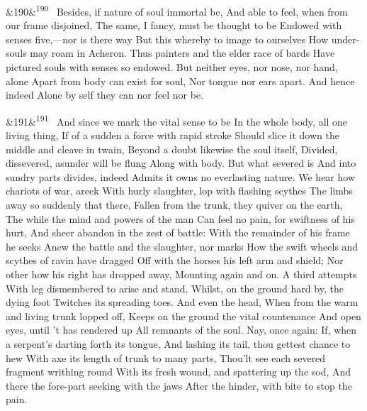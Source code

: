 \documentclass[12pt]{article}
\newcommand{\para}[1][]{\par\noindent\ifx&#1&\else\textsuperscript{\footnotesize #1}~\fi}
\begin{document}
\para[190] Besides, if nature of soul immortal be, And able to feel, when from our frame disjoined, The same, I fancy, must be thought to be Endowed with senses five,---nor is there way But this whereby to image to ourselves How under-souls may roam in Acheron. Thus painters and the elder race of bards Have pictured souls with senses so endowed. But neither eyes, nor nose, nor hand, alone Apart from body can exist for soul, Nor tongue nor ears apart. And hence indeed Alone by self they can nor feel nor be.

\para[191] And since we mark the vital sense to be In the whole body, all one living thing, If of a sudden a force with rapid stroke Should slice it down the middle and cleave in twain, Beyond a doubt likewise the soul itself, Divided, dissevered, asunder will be flung Along with body. But what severed is And into sundry parts divides, indeed Admits it owns no everlasting nature. We hear how chariots of war, areek With hurly slaughter, lop with flashing scythes The limbs away so suddenly that there, Fallen from the trunk, they quiver on the earth, The while the mind and powers of the man Can feel no pain, for swiftness of his hurt, And sheer abandon in the zest of battle: With the remainder of his frame he seeks Anew the battle and the slaughter, nor marks How the swift wheels and scythes of ravin have dragged Off with the horses his left arm and shield; Nor other how his right has dropped away, Mounting again and on. A third attempts With leg dismembered to arise and stand, Whilst, on the ground hard by, the dying foot Twitches its spreading toes. And even the head, When from the warm and living trunk lopped off, Keeps on the ground the vital countenance And open eyes, until 't has rendered up All remnants of the soul. Nay, once again: If, when a serpent's darting forth its tongue, And lashing its tail, thou gettest chance to hew With axe its length of trunk to many parts, Thou'lt see each severed fragment writhing round With its fresh wound, and spattering up the sod, And there the fore-part seeking with the jaws After the hinder, with bite to stop the pain.
\end{document}
